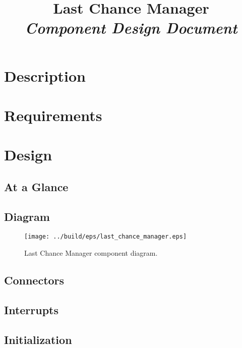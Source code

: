 



\title{\textbf{Last Chance Manager} \\
\large\textit{Component Design Document}}
\date{}
\maketitle

\section{Description}


\section{Requirements}


\section{Design}

\subsection{At a Glance}


\subsection{Diagram}
\begin{figure}[H]
  \texttt{[image: ../build/eps/last\_chance\_manager.eps]}
  \caption{Last Chance Manager component diagram.}
\end{figure}

\subsection{Connectors}


\subsection{Interrupts}



\subsection{Initialization}


